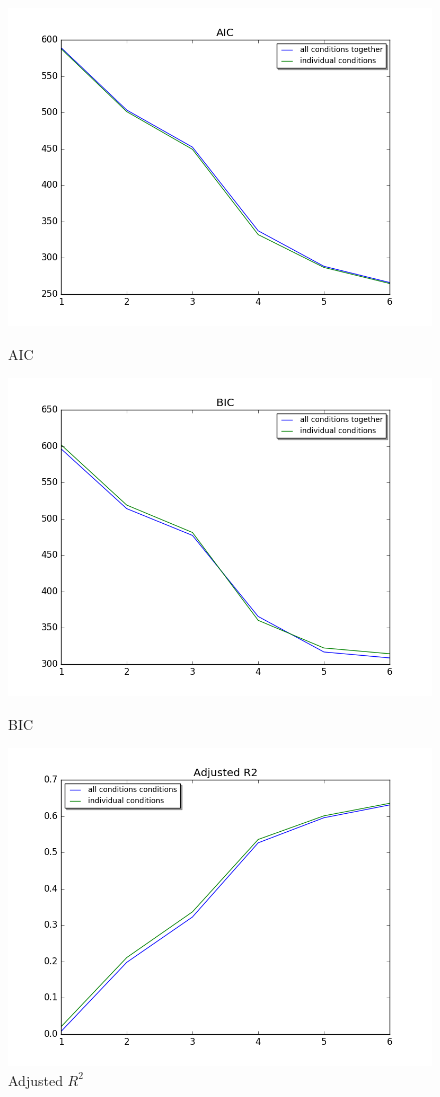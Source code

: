 \begin{figure}
\centering
	\begin{minipage}[b]{0.33\linewidth}
		\centering
		\includegraphics[width=.8\linewidth]{../images/aic_better}  

		\caption{AIC}
		\label{fig:AIC}

	\end{minipage}
	\quad
	\begin{minipage}[b]{0.33\linewidth}
		\centering
		\includegraphics[width=.8\linewidth]{../images/bic_better}  
		\caption{BIC}
		\label{fig:BIC}

	\end{minipage}
		
	\begin{minipage}[b]{0.33\linewidth}
		\centering
		\includegraphics[width=.8\linewidth]{../images/adjr2_better}  
		\caption{Adjusted $R^2$}
		\label{fig:adjr2}


\end{minipage}
\end{figure}
